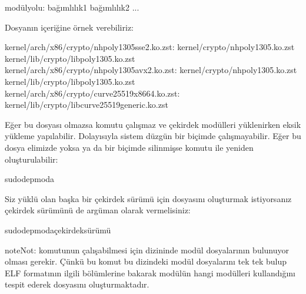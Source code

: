 \documentclass[a4paper,10pt,turkish]{sphinxmanual}
\begin{document}
\begin{sphinxVerbatim}[commandchars=\\\{\}]
\PYGZlt{}modül\PYGZus{}yolu\PYGZgt{}: \PYGZlt{}bağımlılık1\PYGZgt{} \PYGZlt{}bağımlılık2\PYGZgt{} ...
\end{sphinxVerbatim}

\sphinxAtStartPar
Dosyanın içeriğine örnek verebiliriz:

\begin{sphinxVerbatim}[commandchars=\\\{\}]
kernel/arch/x86/crypto/nhpoly1305\PYGZhy{}sse2.ko.zst: kernel/crypto/nhpoly1305.ko.zst kernel/lib/crypto/libpoly1305.ko.zst
kernel/arch/x86/crypto/nhpoly1305\PYGZhy{}avx2.ko.zst: kernel/crypto/nhpoly1305.ko.zst kernel/lib/crypto/libpoly1305.ko.zst
kernel/arch/x86/crypto/curve25519\PYGZhy{}x86\PYGZus{}64.ko.zst: kernel/lib/crypto/libcurve25519\PYGZhy{}generic.ko.zst
\end{sphinxVerbatim}

\sphinxAtStartPar
Eğer bu  dosyası olmazsa  komutu çalışmaz ve çekirdek modülleri yüklenirken
eksik yükleme yapılabilir. Dolayısıyla sistem düzgün bir biçimde çalışmayabilir. Eğer bu dosya
elimizde yoksa ya da bir biçimde silinmişse  komutu ile yeniden oluşturulabilir:

\begin{sphinxVerbatim}[commandchars=\\\{\}]
\PYGZdl{}sudodepmod\PYGZhy{}a
\end{sphinxVerbatim}

\sphinxAtStartPar
Siz yüklü olan başka bir çekirdek sürümü için  dosyasını oluşturmak istiyorsanız
çekirdek sürümünü de argüman olarak vermelisiniz:

\begin{sphinxVerbatim}[commandchars=\\\{\}]
\PYGZdl{}sudodepmod\PYGZhy{}a\PYGZlt{}çekirdek\PYGZus{}sürümü\PYGZgt{}
\end{sphinxVerbatim}

\begin{sphinxadmonition}{note}{Not:}
\sphinxAtStartPar
{} komutunun çalışabilmesi için  dizininde modül
dosyalarının bulunuyor olması gerekir. Çünkü bu komut bu dizindeki modül dosyalarını tek tek bulup
ELF formatının ilgili bölümlerine bakarak modülün hangi modülleri kullandığını tespit ederek
 dosyasını oluşturmaktadır.
\end{sphinxadmonition}
\end{document}
